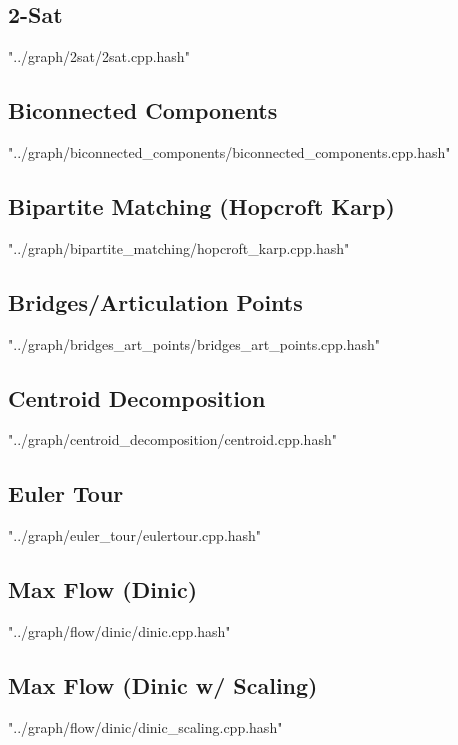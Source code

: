 \documentclass [12pt,onecolumn,oneside]{article}
\begin{document}
\subsection{ 2-Sat}
 {"../graph/2sat/2sat.cpp.hash"}
\newpage

\subsection{ Biconnected Components}
 {"../graph/biconnected_components/biconnected_components.cpp.hash"}
\newpage

\subsection{ Bipartite Matching (Hopcroft Karp)}
 {"../graph/bipartite_matching/hopcroft_karp.cpp.hash"}
\newpage

\subsection{ Bridges/Articulation Points}
 {"../graph/bridges_art_points/bridges_art_points.cpp.hash"}
\newpage

\subsection{ Centroid Decomposition}
 {"../graph/centroid_decomposition/centroid.cpp.hash"}
\newpage

\subsection{ Euler Tour}
 {"../graph/euler_tour/eulertour.cpp.hash"}
\newpage

\subsection{ Max Flow (Dinic)}
 {"../graph/flow/dinic/dinic.cpp.hash"}
\newpage

\subsection{ Max Flow (Dinic w/ Scaling)}
 {"../graph/flow/dinic/dinic_scaling.cpp.hash"}
\newpage
\end{document}

